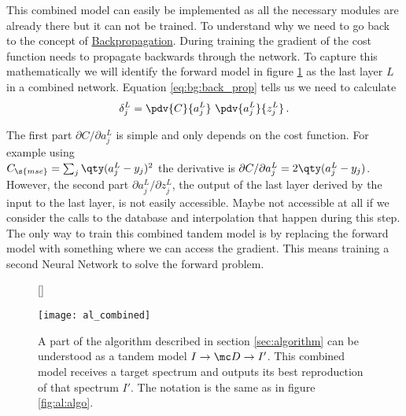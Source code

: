



\indent This combined model can easily be implemented as all the necessary modules are already there but it can not be trained. To understand why we need to go back to the concept of {\hyperref[eq:bg:back_prop]{Backpropagation}}.
During training the gradient of the cost function needs to propagate backwards through the network. To capture this mathematically we will identify the forward model in figure \ref{fig:al:combined} as the last layer $L$ in a combined network. Equation \eqref{eq:bg:back_prop} tells us we need to calculate
\begin{equation}
    \delta^L_j = \pdv{C}{a^L_j} \ \pdv{a^L_j}{z^L_j} \,.
\end{equation}

The first part $\partial C / \partial{a^L_j}$ is simple and only depends on the cost function. For example using \\
$C_\s{mse} = \sum_j \qty(a_j^L - y_j)^2$
the derivative is 
$\partial{C} / \partial{a^L_j} = 2 \qty(a_j^L - y_j)$.
However, the second part 
$\partial{a^L_j} / \partial{z^L_j}$,
the output of the last layer derived by the input to the last layer, is not easily accessible. Maybe not accessible at all if we consider the calls to the database and interpolation that happen during this step. The only way to train this combined tandem model is by replacing the forward model with something where we can access the gradient. This means training a second Neural Network to solve the forward problem.

\begin{figure}[H]
    [\FBwidth]
    {\caption{
        A part of the algorithm described in section \ref{sec:algorithm} can be understood as a tandem model 
        $I \rightarrow \mc D \rightarrow I'$.
        This combined model receives a target spectrum and outputs its best reproduction of that spectrum $I'$. The notation is the same as in figure \ref{fig:al:algo}.
    }
    \label{fig:al:combined}}
    {\texttt{[image: al\_combined]}}
\end{figure}

